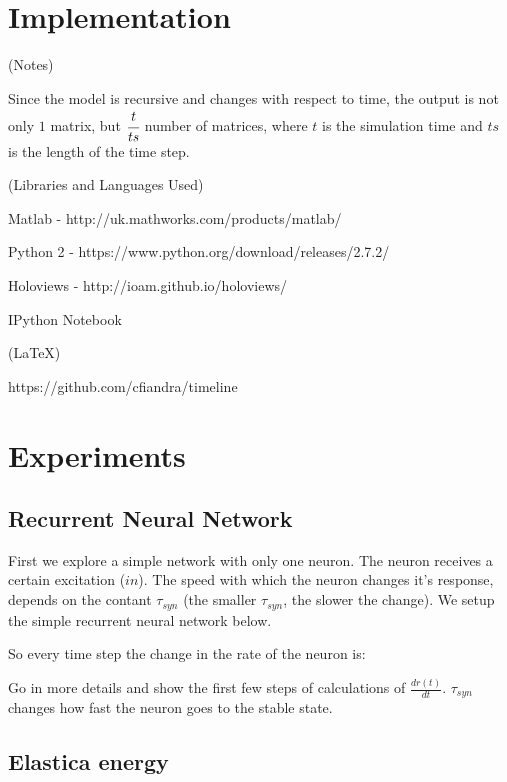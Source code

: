 \chapter{Implementation}

(Notes)

Since the model is recursive and changes with respect to time, the output is not only $1$ matrix, but $\cfrac{t}{ts}$ number of matrices, where $t$ is the simulation time and $ts$ is the length of the time step.

(Libraries and Languages Used)

Matlab - http://uk.mathworks.com/products/matlab/

Python 2 - https://www.python.org/download/releases/2.7.2/

Holoviews - http://ioam.github.io/holoviews/

IPython Notebook

(LaTeX)

https://github.com/cfiandra/timeline

\chapter{Experiments}

\section{Recurrent Neural Network}

First we explore a simple network with only one neuron. The neuron receives a certain excitation ($in$). The speed with which the neuron changes it's response, depends on the contant $\tau_{syn}$ (the smaller $\tau_{syn}$, the slower the change). We setup the simple recurrent neural network below.


So every time step the change in the rate of the neuron is:



Go in more details and show the first few steps of calculations of $\frac{dr(t)}{dt}$. $\tau_{syn}$ changes how fast the neuron goes to the stable state.


\section{Elastica energy}

